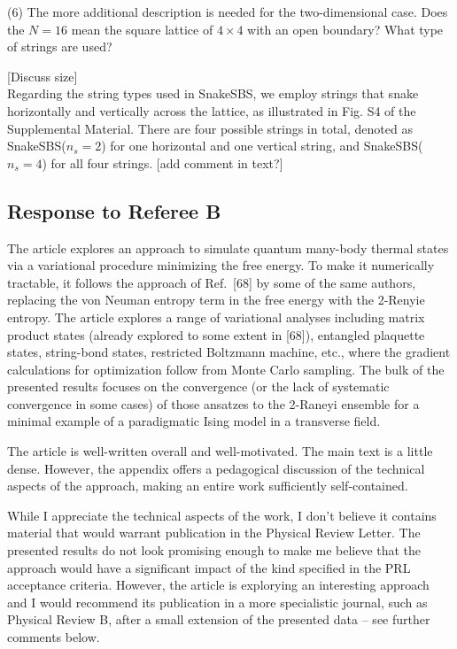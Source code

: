 \documentclass[a4paper,12pt]{article}
\newenvironment{referee}[1]
{\noindent {\bf Referee #1}}
{\vspace{1em}}
\newenvironment{response}
{\noindent \color{blue!40!black}{\bf Response}}
{\vspace{1em}}
\begin{document}
\begin{referee}{A}
	(6) The more additional description is needed for the two-dimensional case.
	Does the $N=16$ mean the square lattice of $4 \times 4$ with an open boundary?
	What type of strings are used?
\end{referee}

\begin{response}
	[Discuss size] \\
	Regarding the string types used in SnakeSBS, we employ strings that snake horizontally and vertically across the lattice, as illustrated in Fig. S4 of the Supplemental Material.
	There are four possible strings in total, denoted as SnakeSBS($n_s=2$) for one horizontal and one vertical string, and SnakeSBS($n_s=4$) for all four strings.
		[add comment in text?]
\end{response}

\subsection*{Response to Referee B}
\begin{referee}{B}
	The article explores an approach to simulate quantum many-body thermal states via a variational procedure minimizing the free energy.
	To make it numerically tractable, it follows the approach of Ref.~[68] by some of the same authors, replacing the von Neuman entropy term in the free energy with the 2-Renyie entropy.
	The article explores a range of variational analyses including matrix
	product states (already explored to some extent in [68]), entangled plaquette states, string-bond states, restricted Boltzmann machine, etc., where the gradient calculations for optimization follow from Monte Carlo sampling.
	The bulk of the presented results focuses on the convergence (or the lack of systematic convergence in some cases) of those ansatzes to the 2-Raneyi ensemble for a minimal example of a paradigmatic Ising model in a transverse field.

	The article is well-written overall and well-motivated.
	The main text is a little dense.
	However, the appendix offers a pedagogical discussion of the technical aspects of the approach, making an entire work sufficiently self-contained.

	While I appreciate the technical aspects of the work, I don't believe it contains material that would warrant publication in the Physical Review Letter.
	The presented results do not look promising enough to make me believe that the approach would have a significant impact of the kind specified in the PRL acceptance criteria.
	However, the article is explorying an interesting approach and I would recommend its publication in a more specialistic journal, such as Physical Review B, after a small extension of the presented data -- see further comments below.
\end{referee}
\end{document}
